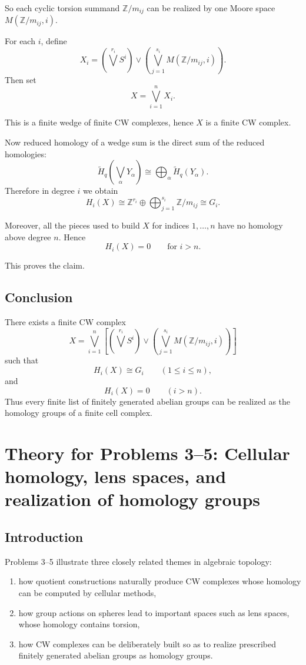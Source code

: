 \documentclass[12pt,a4paper]{article}
\theoremstyle{notespace}
\begin{document}
So each cyclic torsion summand \(\mathbb Z/m_{ij}\) can be realized by one Moore space \(M(\mathbb Z/m_{ij},i)\).

\medskip
\noindent
For each \(i\), define
\[
X_i
=
\left(\bigvee^{r_i} S^i\right)
\vee
\left(\bigvee_{j=1}^{s_i} M(\mathbb Z/m_{ij},i)\right).
\]
Then set
\[
X=\bigvee_{i=1}^n X_i.
\]

This is a finite wedge of finite CW complexes, hence \(X\) is a finite CW complex.

Now reduced homology of a wedge sum is the direct sum of the reduced homologies:
\[
\widetilde H_q\!\left(\bigvee_\alpha Y_\alpha\right)
\cong
\bigoplus_\alpha \widetilde H_q(Y_\alpha).
\]
Therefore in degree \(i\) we obtain
\[
H_i(X)
\cong
\mathbb Z^{r_i}\oplus \bigoplus_{j=1}^{s_i}\mathbb Z/m_{ij}
\cong
G_i.
\]

Moreover, all the pieces used to build \(X\) for indices \(1,\dots,n\) have no homology above degree \(n\). Hence
\[
H_i(X)=0 \qquad \text{for } i>n.
\]

This proves the claim.

\subsection*{Conclusion}
There exists a finite CW complex
\[
X=\bigvee_{i=1}^n
\left[
\left(\bigvee^{r_i} S^i\right)
\vee
\left(\bigvee_{j=1}^{s_i} M(\mathbb Z/m_{ij},i)\right)
\right]
\]
such that
\[
H_i(X)\cong G_i \qquad (1\le i\le n),
\]
and
\[
H_i(X)=0 \qquad (i>n).
\]
Thus every finite list of finitely generated abelian groups can be realized as the homology groups of a finite cell complex.

\section{Theory for Problems 3--5: Cellular homology, lens spaces, and realization of homology groups}

\subsection*{Introduction}
Problems 3--5 illustrate three closely related themes in algebraic topology:
\begin{enumerate}
	\item how quotient constructions naturally produce CW complexes whose homology can be computed by cellular methods,
	\item how group actions on spheres lead to important spaces such as lens spaces, whose homology contains torsion,
	\item how CW complexes can be deliberately built so as to realize prescribed finitely generated abelian groups as homology groups.
\end{enumerate}
\end{document}
